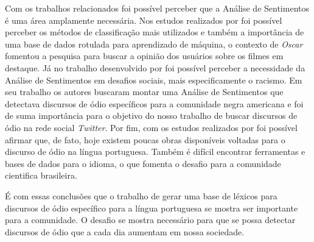 Com os trabalhos relacionados foi possível perceber que a Análise de Sentimentos é uma área amplamente necessária. Nos estudos realizados por  foi possível perceber os métodos de classificação mais utilizados e também a importância de uma base de dados rotulada para aprendizado de máquina, o contexto de \textit{Oscar} fomentou a pesquisa para buscar a opinião dos usuários sobre os filmes em destaque. Já no trabalho desenvolvido por  foi possível perceber a necessidade da Análise de Sentimentos em desafios sociais, mais especificamente o racismo. Em seu trabalho os autores buscaram montar uma Análise de Sentimentos que detectava discursos de ódio específicos para a comunidade negra americana e foi de suma importância para o objetivo do nosso trabalho de buscar discursos de ódio na rede social \textit{Twitter}. Por fim, com os estudos realizados por  foi possível afirmar que, de fato, hoje existem poucas obras disponíveis voltadas para o discurso de ódio na língua portuguesa. Também é difícil encontrar ferramentas e bases de dados para o idioma, o que fomenta o desafio para a comunidade cientifica brasileira.

É com essas conclusões que o trabalho de gerar uma base de léxicos para discursos de ódio específico para a língua portuguesa se mostra ser importante para a comunidade. O desafio se mostra necessário para que se possa detectar discursos de ódio que a cada dia aumentam em nossa sociedade.